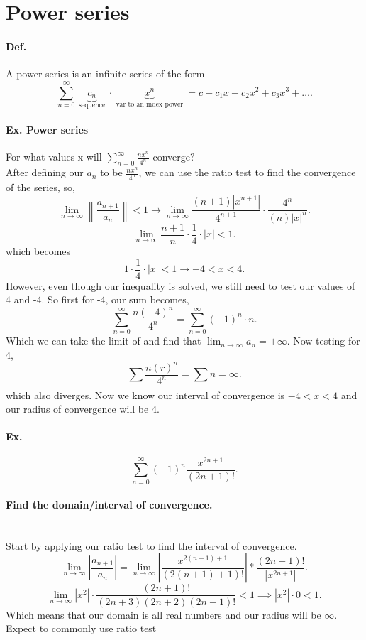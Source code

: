 \section*{Power series}%
\label{sec:Power series}

\paragraph{Def.}
A power series is an infinite series of the form 
\[
\sum_{ n=0 } ^{ \infty } \underbrace{ c_n }_{ \text{ sequence } } \cdot  \underbrace{ x^{ n } }_{ \text{ var to an index power } } = c+ c_1x+ c_2x^2+ c_3x^3+ \ldots
.\] 
\paragraph{Ex. Power series}
For what values x will $ \sum_{ n=0 } ^{ \infty } \frac{ nx^{ n } }{ 4^{ n } }$ converge? \\
After defining our $ a_n $ to be $ \frac{ nx^{ n } }{ 4^{ n } } $, we can use the ratio test to find the convergence of the series, so,
\[
\lim_{ n \to \infty} \left\| \frac{ a_{ n+1 } }{ a_n } \right\| < 1 \to \lim_{ n \to \infty} \frac{ \left( n+1 \right) |x^{ n+1 }| }{ 4^{ n+1 } }\cdot \frac{ 4^{ n } }{ \left( n \right) |x|^{ n } }
.\] 
\[
\lim_{ n \to \infty} \frac{ n+1 }{ n }\cdot \frac{ 1 }{ 4 } \cdot \left| x \right| < 1
.\] 
which becomes
\[
1\cdot \frac{ 1 }{ 4 } \cdot \left| x \right| < 1 \to -4 < x < 4
.\] 
However, even though our inequality is solved, we still need to test our values of 4 and -4. So first for -4, our sum becomes,
\[
\sum_{ n=0 } ^{ \infty } \frac{ n\left( -4 \right) ^{ n } }{ 4^{ n } }= \sum_{ n=0 } ^{ \infty } \left( -1 \right) ^{ n }\cdot n
.\] 
Which we can take the limit of and find that $ \lim_{ n \to \infty} a_n = \pm \infty $. Now testing for 4, 
\[
\sum_{  } ^{  } \frac{ n\left( r \right) ^{ n } }{ 4^{ n } }= \sum_{  } ^{  } n  = \infty
.\] 
which also diverges. Now we know our interval of convergence is $ -4 < x < 4 $ and our radius of convergence will be 4.

\paragraph{Ex.}
\[
\sum_{ n=0 } ^{ \infty } \left( -1 \right) ^{ n } \frac{ x^{ 2n+1 } }{ \left( 2n+1 \right) ! }
.\] 
\paragraph{Find the domain/interval of convergence.}
\\ Start by applying our ratio test to find the interval of convergence.
\[
\lim_{ n \to \infty} \left| \frac{ a_{ n+1 } }{ a_n } \right|= \lim_{ n \to \infty} \left| \frac{ x^{ 2\left( n+1 \right) +1 } }{ \left( 2\left( n+1 \right) +1 \right) ! } \right| * \frac{ \left( 2n+1 \right) ! }{ \left| x^{ 2n+1 } \right| }
.\] 
\[
\lim_{ n \to \infty} \left| x^2 \right|\cdot \frac{ \left( 2n+1 \right) !}{ \left( 2n+3 \right) \left( 2n+2 \right) \left( 2n+1 \right) ! } < 1 \implies \left| x^2 \right|\cdot 0< 1 
.\] 
Which means that our domain is all real numbers and our radius will be $ \infty $. Expect to commonly use ratio test

